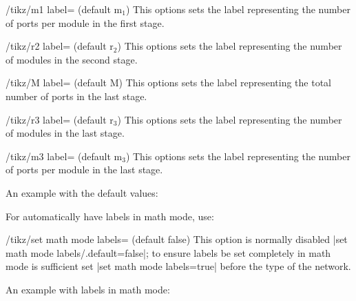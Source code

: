\documentclass{ltxdoc} %
\begin{document}
\begin{key}{/tikz/m1 label= (default m$_1$)}
    This options sets the label representing the number of ports per module in the first stage.
\end{key}

\begin{key}{/tikz/r2 label= (default r$_2$)}
    This options sets the label representing the number of modules in the second stage.
\end{key}

\begin{key}{/tikz/M label= (default M)}
    This options sets the label representing the total number of ports in the last stage.
\end{key}

\begin{key}{/tikz/r3 label= (default r$_3$)}
    This options sets the label representing the number of modules in the last stage.
\end{key}

\begin{key}{/tikz/m3 label= (default m$_3$)}
    This options sets the label representing the number of ports per module in the last stage.
\end{key}

An example with the default values:

\begin{codeexample}[]
\end{codeexample}

For automatically have labels in math mode, use:
\begin{key}{/tikz/set math mode labels= (default false)}
	This option is normally disabled |set math mode labels/.default=false|; to ensure labels be set completely in math mode is sufficient set |set math mode labels=true| before the type of the network.
\end{key}

An example with labels in math mode:
\begin{codeexample}[]
\end{codeexample}
\end{document}
